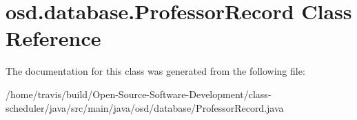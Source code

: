 \hypertarget{classosd_1_1database_1_1_professor_record}{\section{osd.\-database.\-Professor\-Record Class Reference}
\label{classosd_1_1database_1_1_professor_record}
}


The documentation for this class was generated from the following file\-:\begin{DoxyCompactItemize}
\item 
/home/travis/build/\-Open-\/\-Source-\/\-Software-\/\-Development/class-\/scheduler/java/src/main/java/osd/database/Professor\-Record.\-java\end{DoxyCompactItemize}
